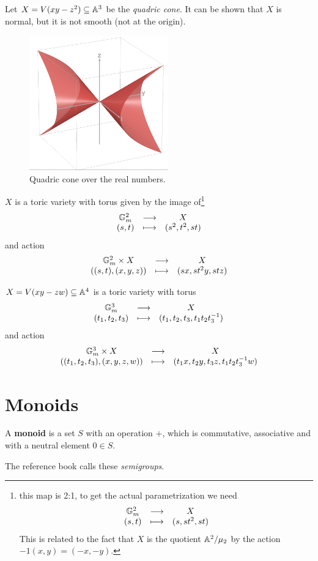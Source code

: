 \begin{example}
Let $X=V(xy-z^2)\subseteq \mathbb{A}^3$ be the \textit{quadric cone}. It can be shown that $X$ is normal, but it is not smooth (not at the origin).

\begin{figure}[!htb]
    \centering
    \includegraphics[width=6cm]{Images/quadric cone.png}
    \caption{Quadric cone over the real numbers.}
\end{figure}


$X$ is a toric variety with torus given by the image of\footnote{this map is 2:1, to get the actual parametrization we need
\[\begin{array}{ccc} {\mathbb{G}_m^2} & \longrightarrow & {X}\\ {(s,t)} & \longmapsto & {(s,st^2,st)} \end{array}\]
This is related to the fact that $X$ is the quotient $\mathbb{A}^2/\mu_2$ by the action $-1(x,y)=(-x,-y)$.}
\[\begin{array}{ccc} {\mathbb{G}_m^2} & \longrightarrow & {X}\\ {(s,t)} & \longmapsto & {(s^2,t^2,st)} \end{array}\]
and action
\[\begin{array}{ccc} {\mathbb{G}_m^2\times X} & \longrightarrow & {X}\\ {((s,t),(x,y,z))} & \longmapsto & {(sx,st^2y,stz)} \end{array}\]
\end{example}


\begin{example}
$X=V(xy-zw)\subseteq \mathbb{A}^4$ is a toric variety with torus
\[\begin{array}{ccc} {\mathbb{G}_m^3} & \longrightarrow & {X}\\ {(t_1,t_2,t_3)} & \longmapsto & {(t_1,t_2,t_3,t_1t_2t_3^{-1})} \end{array}\]
and action 
\[\begin{array}{ccc} {\mathbb{G}_m^3\times X} & \longrightarrow & {X}\\ {((t_1,t_2,t_3),(x,y,z,w))} & \longmapsto & {(t_1x,t_2y,t_3z,t_1t_2t_3^{-1} w)} \end{array}\]
\end{example}


\section{Monoids}

\begin{definition}[Monoid]
A \textbf{monoid} is a set $S$ with an operation $+$, which is commutative, associative and with a neutral element $0\in S$.
\end{definition}

\begin{remark}
The reference book \cite{cox2011toric} calls these \textit{semigroups}.
\end{remark}


